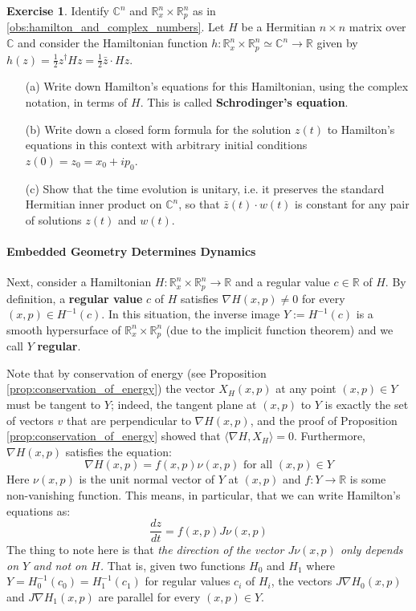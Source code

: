 \documentclass[12pt]{article}
\theoremstyle{definition}
\newtheorem{exercise}[theorem]{Exercise}
\numberwithin{equation}{section}
\newcommand{\C}{{\mathbb C}}
\newcommand{\R}{{\mathbb R}}
\begin{document}
\begin{exercise} Identify $\C^n$ and $\R^n_x \times \R^n_p$ as in \ref{obs:hamilton_and_complex_numbers}. Let $H$ be a Hermitian $n \times n$ matrix over $\C$ and consider the Hamiltonian function $h:\R^n_x \times \R^n_p \simeq \C^n \to \R$ given by $h(z) = \frac{1}{2} z^\dag H z = \frac{1}{2} \bar{z} \cdot Hz$. 

\begin{itemize}
\item[(a)] Write down Hamilton's equations for this Hamiltonian, using the complex notation, in terms of $H$. This is called {\bf Schrodinger's equation}.
\item[(b)] Write down a closed form formula for the solution $z(t)$ to Hamilton's equations in this context with arbitrary initial conditions $z(0) = z_0 = x_0 + ip_0$. 
\item[(c)] Show that the time evolution is unitary, i.e. it preserves the standard Hermitian inner product on $\C^n$, so that $\bar{z}(t) \cdot w(t)$ is constant for any pair of solutions $z(t)$ and $w(t)$.
\end{itemize}
\end{exercise} 

\paragraph{Embedded Geometry Determines Dynamics} Next, consider a Hamiltonian $H:\R^n_x \times \R^n_p \to \R$ and a regular value $c \in \R$ of $H$. By definition, a {\bf regular value} $c$ of $H$ satisfies $\nabla H(x,p) \neq 0$ for every $(x,p) \in H^{-1}(c)$. In this situation, the inverse image $Y := H^{-1}(c)$ is a smooth hypersurface of $\R^n_x \times \R^n_p$ (due to the implicit function theorem) and we call $Y$ {\bf regular}.

Note that by conservation of energy (see Proposition \ref{prop:conservation_of_energy}) the vector $X_H(x,p)$ at any point $(x,p) \in Y$ must be tangent to $Y$; indeed, the tangent plane at $(x,p)$ to $Y$ is exactly the set of vectors $v$ that are perpendicular to $\nabla H(x,p)$, and the proof of Proposition \ref{prop:conservation_of_energy} showed that $\langle \nabla H,X_H\rangle = 0$. Furthermore, $\nabla H(x,p)$ satisfies the equation:
\[\nabla H(x,p) = f(x,p) \nu(x,p) \text{ for all }(x,p) \in Y\]
Here $\nu(x,p)$ is the unit normal vector of $Y$ at $(x,p)$ and $f:Y \to \R$ is some non-vanishing function. This means, in particular, that we can write Hamilton's equations as:
\[
\frac{dz}{dt} = f(x,p) J\nu(x,p)
\]
The thing to note here is that \emph{the direction of the vector $J\nu(x,p)$ only depends on $Y$ and not on $H$.} That is, given two functions $H_0$ and $H_1$ where $Y = H_0^{-1}(c_0) = H_1^{-1}(c_1)$ for regular values $c_i$ of $H_i$, the vectors $J\nabla H_0(x,p)$ and $J\nabla H_1(x,p)$ are parallel for every $(x,p) \in Y$. 
\end{document}
